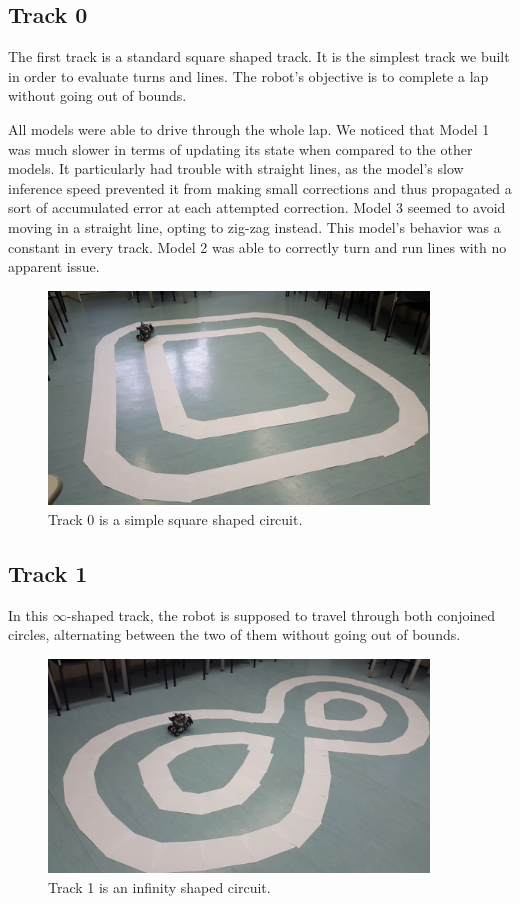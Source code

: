 \subsection{Track 0}

The first track is a standard square shaped track. It is the simplest track we built in order to
evaluate turns and lines. The robot's objective is to complete a lap without going out of bounds.

All models were able to drive through the whole lap. We noticed that Model 1 was much slower in
terms of updating its state when compared to the other models. It particularly had trouble with
straight lines, as the model's slow inference speed prevented it from making small corrections and
thus propagated a sort of accumulated error at each attempted correction. Model 3 seemed to avoid
moving in a straight line, opting to zig-zag instead. This model's behavior was a constant in every
track. Model 2 was able to correctly turn and run lines with no apparent issue.

\begin{figure}[h]
  \centering\includegraphics[width=0.9\textwidth]{imgs/track_0.png}
  \caption{Track 0 is a simple square shaped circuit.}
\end{figure}

\subsection{Track 1}

In this $\infty$-shaped track, the robot is supposed to travel through both conjoined circles,
alternating between the two of them without going out of bounds.

\begin{figure}[h]
  \centering\includegraphics[width=0.9\textwidth]{imgs/track_1.png}
  \caption{Track 1 is an infinity shaped circuit.}
\end{figure}

